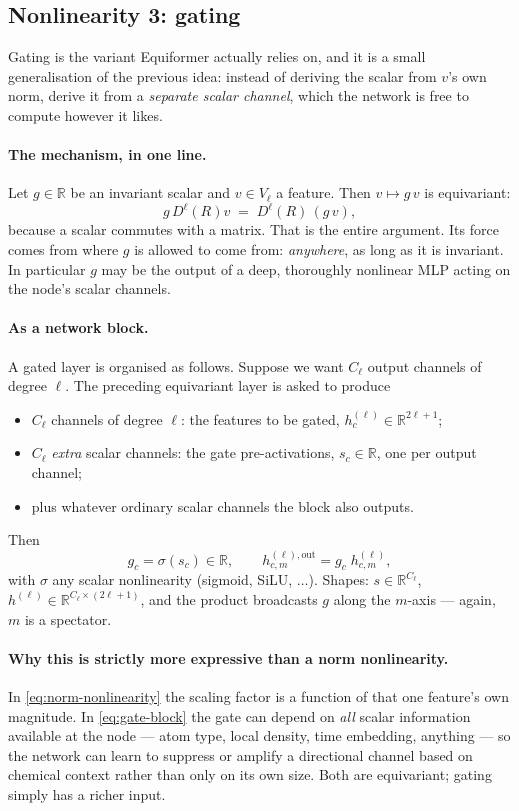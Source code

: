 \documentclass[11pt,a4paper]{report}
\theoremstyle{definition}
\theoremstyle{remark}
\newcommand{\RR}{\mathbb R}
\begin{document}
\subsection{Nonlinearity 3: gating}
\label{sec:nonlin-gate}

Gating is the variant Equiformer actually relies on, and it is a small
generalisation of the previous idea: instead of deriving the scalar from
$v$'s own norm, derive it from a \emph{separate scalar channel}, which the
network is free to compute however it likes.

\paragraph{The mechanism, in one line.} Let $g\in\RR$ be an invariant scalar
and $v\in V_\ell$ a feature. Then $v\mapsto g\,v$ is equivariant:
\[
g\,D^\ell(R)v \;=\; D^\ell(R)\,(g\,v) ,
\]
because a scalar commutes with a matrix. That is the entire argument. Its
force comes from where $g$ is allowed to come from: \emph{anywhere}, as long
as it is invariant. In particular $g$ may be the output of a deep,
thoroughly nonlinear MLP acting on the node's scalar channels.

\paragraph{As a network block.} A gated layer is organised as follows.
Suppose we want $C_\ell$ output channels of degree $\ell$. The preceding
equivariant layer is asked to produce
\begin{itemize}[nosep]
\item $C_\ell$ channels of degree $\ell$: the features to be gated,
$h^{(\ell)}_{c}\in\RR^{2\ell+1}$;
\item $C_\ell$ \emph{extra} scalar channels: the gate pre-activations,
$s_c\in\RR$, one per output channel;
\item plus whatever ordinary scalar channels the block also outputs.
\end{itemize}
Then
\begin{equation}
\label{eq:gate-block}
g_c=\sigma(s_c)\in\RR,
\qquad
h^{(\ell),\mathrm{out}}_{c,m} = g_c\;h^{(\ell)}_{c,m} ,
\end{equation}
with $\sigma$ any scalar nonlinearity (sigmoid, SiLU, $\dots$). Shapes:
$s\in\RR^{C_\ell}$, $h^{(\ell)}\in\RR^{C_\ell\times(2\ell+1)}$, and the
product broadcasts $g$ along the $m$-axis --- again, $m$ is a spectator.

\paragraph{Why this is strictly more expressive than a norm nonlinearity.}
In \eqref{eq:norm-nonlinearity} the scaling factor is a function of that one
feature's own magnitude. In \eqref{eq:gate-block} the gate can depend on
\emph{all} scalar information available at the node --- atom type, local
density, time embedding, anything --- so the network can learn to suppress or
amplify a directional channel based on chemical context rather than only on
its own size. Both are equivariant; gating simply has a richer input.
\end{document}
